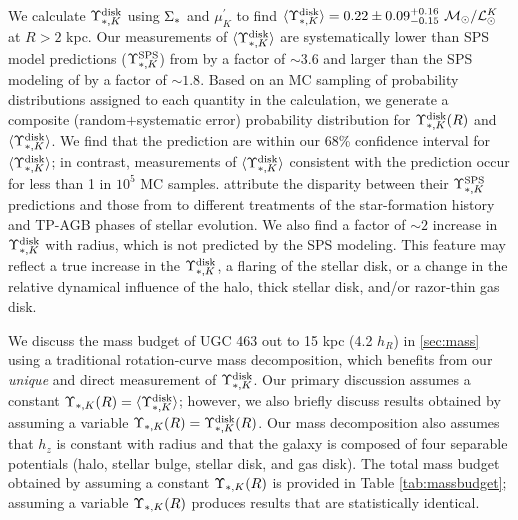 \documentclass[apj,iop,numberedappendix]{emulateapj}
\begin{document}
We calculate $\Upsilon_{\ast,K}^{\rm disk}$ using $\Sigma_{\rm \ast}$ and $\mu^{\prime}_K$ to find
$\langle \Upsilon_{\ast,K}^{\rm disk} \rangle = 0.22\pm0.09^{+0.16}_{-0.15}\ \mathcal{M}_\odot/\mathcal{L}_\odot^K$ at $R>2$ kpc.
Our measurements of $\langle \Upsilon_{\ast,K}^{\rm disk} \rangle$ are systematically lower than SPS
model predictions ($\Upsilon_{\ast,K}^{\rm SPS}$) from  by a factor
of $\sim 3.6$ and larger than the SPS modeling of
 by a factor of $\sim 1.8$.  Based on an MC
sampling of probability distributions assigned to each quantity in the
calculation, we generate a composite (random$+$systematic error) probability
distribution for $\Upsilon_{\ast,K}^{\rm disk}(R)$ and $\langle \Upsilon_{\ast,K}^{\rm disk} \rangle$.  We find that the
 prediction are within our 68\% confidence
interval for $\langle \Upsilon_{\ast,K}^{\rm disk} \rangle$; in contrast, measurements of
$\langle \Upsilon_{\ast,K}^{\rm disk} \rangle$ consistent with the 
prediction occur for less than 1 in $10^5$ MC samples.
 attribute the disparity between their
$\Upsilon_{\ast,K}^{\rm SPS}$ predictions and those from  to
different treatments of the star-formation history and TP-AGB phases of stellar
evolution.  We also find a factor of $\sim2$ increase in $\Upsilon_{\ast,K}^{\rm disk}$ with
radius, which is not predicted by the SPS modeling.  This feature may reflect a
true increase in the $\Upsilon_{\ast,K}^{\rm disk}$, a flaring of the stellar disk, or a change in
the relative dynamical influence of the halo, thick stellar disk, and/or
razor-thin gas disk.

We discuss the mass budget of UGC 463 out to 15 kpc (4.2 $h_R$) in \sect
\ref{sec:mass} using a traditional rotation-curve mass decomposition, which
benefits from our {\it unique} and direct measurement of $\Upsilon_{\ast,K}^{\rm disk}$.  Our
primary discussion assumes a constant $\Upsilon_{\ast,K}(R) = \langle \Upsilon_{\ast,K}^{\rm disk} \rangle$; however,
we also briefly discuss results obtained by assuming a variable $\Upsilon_{\ast,K}(R) =
\Upsilon_{\ast,K}^{\rm disk}(R)$.  Our mass decomposition also assumes that $h_z$ is constant with
radius and that the galaxy is composed of four separable potentials (halo,
stellar bulge, stellar disk, and gas disk).  The total mass budget obtained by
assuming a constant $\Upsilon_{\ast,K}(R)$ is provided in Table \ref{tab:massbudget};
assuming a variable $\Upsilon_{\ast,K}(R)$ produces results that are statistically
identical.
\end{document}
